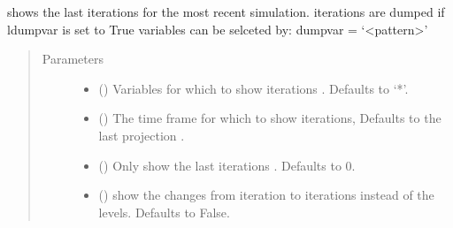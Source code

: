 \documentclass[letterpaper,10pt,english]{sphinxmanual}
\begin{document}
\begin{fulllineitems}
\begin{fulllineitems}
\label{\detokenize{core/modelclass:modelclass.Solver_Mixin.show_iterations}}
\pysigstartsignatures
{}
\pysigstopsignatures
\sphinxAtStartPar
shows the last iterations for the most recent simulation.
iterations are dumped if ldumpvar is set to True
variables can be selceted by: dumpvar = ‘\textless{}pattern\textgreater{}’
\begin{quote}\begin{description}
\item[{Parameters}] \leavevmode\begin{itemize}
\item {} 
\sphinxAtStartPar
{} (\sphinxstyleliteralemphasis{\sphinxupquote{, }}) \textendash{} Variables for which to show iterations . Defaults to ‘*’.

\item {} 
\sphinxAtStartPar
{} (\sphinxstyleliteralemphasis{\sphinxupquote{, }}) \textendash{} The time frame for which to show iterations, Defaults to the last projection .

\item {} 
\sphinxAtStartPar
{} (\sphinxstyleliteralemphasis{\sphinxupquote{, }}) \textendash{} Only show the last iterations . Defaults to 0.

\item {} 
\sphinxAtStartPar
{} (\sphinxstyleliteralemphasis{\sphinxupquote{, }}) \textendash{} show the changes from iteration to iterations instead of the levels. Defaults to False.


\end{itemize}
\end{description}
\end{quote}
\end{fulllineitems}
\end{fulllineitems}
\end{document}
